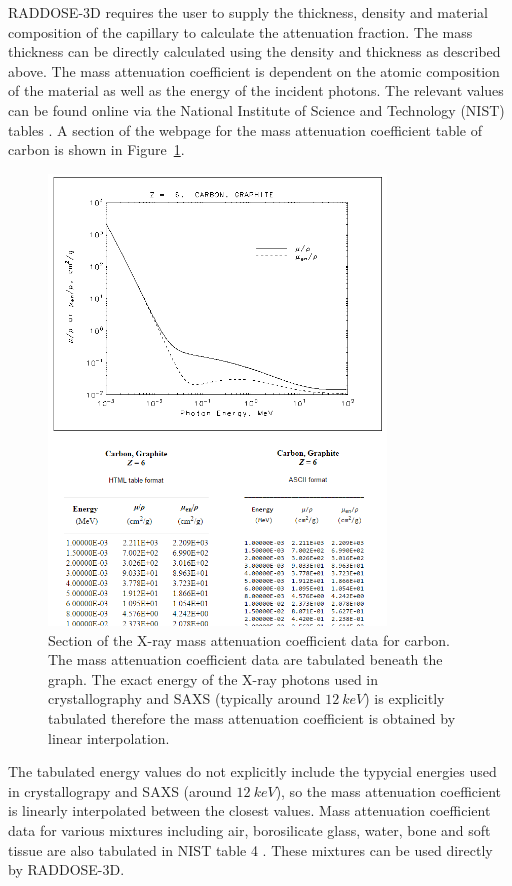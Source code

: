 RADDOSE-3D requires the user to supply the thickness, density and material composition of the capillary to calculate the attenuation fraction.
The mass thickness can be directly calculated using the density and thickness as described above.
The mass attenuation coefficient is dependent on the atomic composition of the material as well as the energy of the incident photons.
The relevant values can be found online via the National Institute of Science and Technology (NIST) tables \cite{nisttable3,nisttable4}.
A section of the webpage for the mass attenuation coefficient table of carbon is shown in Figure~\ref{fig:NIST table for carbon}.
\begin{figure}
    \centering
    \includegraphics[width=0.8\textwidth]{figures/saxs/nist_table_carbon.png}
    \caption{Section of the X-ray mass attenuation coefficient data for carbon. The mass attenuation coefficient data are tabulated beneath the graph. The exact energy of the X-ray photons used in crystallography and SAXS (typically around $12\ keV$) is explicitly tabulated therefore the mass attenuation coefficient is obtained by linear interpolation.}
    \label{fig:NIST table for carbon}
\end{figure}
The tabulated energy values do not explicitly include the typycial energies used in crystallograpy and SAXS (around $12\ keV$), so the mass attenuation coefficient is linearly interpolated between the closest values.
Mass attenuation coefficient data for various mixtures including air, borosilicate glass, water, bone and soft tissue are also tabulated in NIST table 4 \cite{nisttable4}.
These mixtures can be used directly by RADDOSE-3D.

